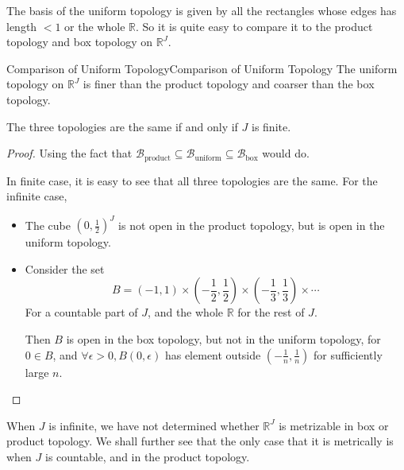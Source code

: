 \documentclass[../main.tex]{subfiles}
\begin{document}
The basis of the uniform topology is given by all the rectangles whose edges has length $<1$ or the whole $\mathbb{R}$. So it is quite easy to compare it to the product topology and box topology on $\mathbb{R}^J$.

\begin{theorem}{Comparison of Uniform Topology}{Comparison of Uniform Topology}
	The uniform topology on $\mathbb{R}^J$ is finer than the product topology and coarser than the box topology.

	The three topologies are the same if and only if $J$ is finite.
\end{theorem}
\begin{proof}
Using the fact that $\mathcal{B}_{\text{product}} \subseteq \mathcal{B}_{\text{uniform}} \subseteq \mathcal{B}_{\text{box}}$ would do.

In finite case, it is easy to see that all three topologies are the same. For the infinite case, 
\begin{itemize}
\item The cube $(0, \frac{1}{2})^{J}$ is not open in the product topology, but is open in the uniform topology.
\item Consider the set
\begin{equation*}
	B = (-1,1) \times (-\frac{1}{2}, \frac{1}{2}) \times (-\frac{1}{3}, \frac{1}{3}) \times \cdots 
\end{equation*}
For a countable part of $J$, and the whole $\mathbb{R}$ for the rest of $J$. 

Then $B$ is open in the box topology, but not in the uniform topology, for $0\in B$, and $\forall \epsilon>0, B(0,\epsilon)$ has element outside $(-\frac{1}{n},\frac{1}{n})$ for sufficiently large $n$.
\end{itemize}
\end{proof}

When $J$ is infinite, we have not determined whether $\mathbb{R}^J$ is metrizable in box or product topology. We shall further see that the only case that it is metrically is when $J$ is countable, and in the product topology.
\end{document}
